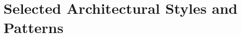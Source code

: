 \documentclass[../../DD.tex]{subfiles}
\begin{document}
\section{Selected Architectural Styles and Patterns\label{sect:2.6}}






\newpage
\end{document}
